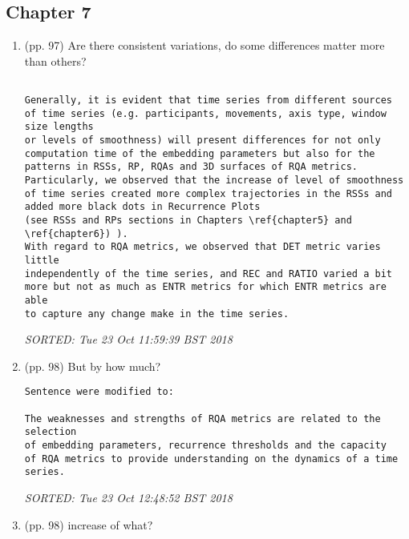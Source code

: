 \documentclass[10pt]{article}
\begin{document}
\subsection{Chapter 7}

\begin{enumerate}

\item (pp. 97) Are there consistent variations, do some differences
	matter more than others?


\begin{verbatim}

Generally, it is evident that time series from different sources 
of time series (e.g. participants, movements, axis type, window size lengths 
or levels of smoothness) will present differences for not only 
computation time of the embedding parameters but also for the 
patterns in RSSs, RP, RQAs and 3D surfaces of RQA metrics. 
Particularly, we observed that the increase of level of smoothness 
of time series created more complex trajectories in the RSSs and 
added more black dots in Recurrence Plots 
(see RSSs and RPs sections in Chapters \ref{chapter5} and \ref{chapter6}) ).
With regard to RQA metrics, we observed that DET metric varies little 
independently of the time series, and REC and RATIO varied a bit 
more but not as much as ENTR metrics for which ENTR metrics are able 
to capture any change make in the time series.

\end{verbatim}
\textit{
SORTED: 
Tue 23 Oct 11:59:39 BST 2018
}
\\





\item (pp. 98) But by how much?



\begin{verbatim}
Sentence were modified to:

The weaknesses and strengths of RQA metrics are related to the selection
of embedding parameters, recurrence thresholds and the capacity 
of RQA metrics to provide understanding on the dynamics of a time series.

\end{verbatim}
\textit{
SORTED: 
Tue 23 Oct 12:48:52 BST 2018
}
\\



\item (pp. 98) increase of what?


\end{enumerate}
\end{document}
